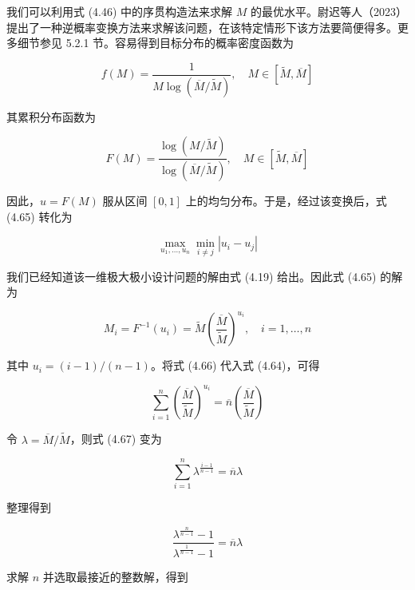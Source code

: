 \documentclass{ctexart}
\begin{document}
我们可以利用式 (4.46) 中的序贯构造法来求解 $M$ 的最优水平。尉迟等人（2023）提出了一种逆概率变换方法来求解该问题，在该特定情形下该方法要简便得多。更多细节参见 5.2.1 节。容易得到目标分布的概率密度函数为

\begin{equation*}
f(M)=\frac{1}{M\log\left(\overline{M}/\widetilde{M}\right)},\quad M\in\left[\widetilde{M},\overline{M}\right]
\end{equation*}

其累积分布函数为

\begin{equation*}
F(M)=\frac{\log\left(M/\widetilde{M}\right)}{\log\left(\overline{M}/\widetilde{M}\right)},\quad M\in\left[\widetilde{M},\overline{M}\right]
\end{equation*}

因此，$u=F(M)$ 服从区间 $[0,1]$ 上的均匀分布。于是，经过该变换后，式 (4.65) 转化为

\begin{equation*}
\max_{u_1,\dots,u_n}\min_{i\neq j}|u_i-u_j|
\end{equation*}

我们已经知道该一维极大极小设计问题的解由式 (4.19) 给出。因此式 (4.65) 的解为

\begin{equation*}
M_i=F^{-1}(u_i)=\widetilde{M}\left(\frac{\overline{M}}{\widetilde{M}}\right)^{u_i},\quad i=1,\dots,n
\tag{4.66}
\end{equation*}

其中 $u_i=(i-1)/(n-1)$。将式 (4.66) 代入式 (4.64)，可得

\begin{equation*}
\sum_{i=1}^n\left(\frac{\overline{M}}{\widetilde{M}}\right)^{u_i}=\overline{n}\left(\frac{\overline{M}}{\widetilde{M}}\right)
\tag{4.67}
\end{equation*}

令 $\lambda=\overline{M}/\widetilde{M}$，则式 (4.67) 变为

\begin{equation*}
\sum_{i=1}^n\lambda^{\frac{i-1}{n-1}}=\overline{n}\lambda
\end{equation*}

整理得到

\begin{equation*}
\frac{\lambda^{\frac{n}{n-1}}-1}{\lambda^{\frac{1}{n-1}}-1}=\overline{n}\lambda
\end{equation*}

求解 $n$ 并选取最接近的整数解，得到
\end{document}
